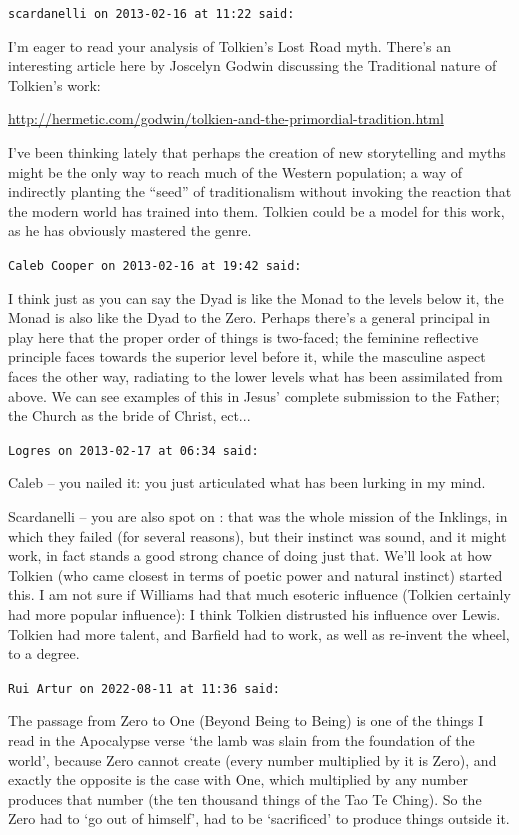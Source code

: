 \begin{footnotesize}
\begin{sffamily}
\texttt{scardanelli on 2013-02-16 at 11:22 said:}

I'm eager to read your analysis of Tolkien's Lost Road myth. There's an interesting article here by Joscelyn Godwin discussing the Traditional nature of Tolkien's work:

\url{http://hermetic.com/godwin/tolkien-and-the-primordial-tradition.html}


I've been thinking lately that perhaps the creation of new storytelling and myths might be the only way to reach much of the Western population; a way of indirectly planting the ``seed'' of traditionalism without invoking the reaction that the modern world has trained into them. Tolkien could be a model for this work, as he has obviously mastered the genre.

\hfill

\texttt{Caleb Cooper on 2013-02-16 at 19:42 said:}

I think just as you can say the Dyad is like the Monad to the levels below it, the Monad is also like the Dyad to the Zero. Perhaps there's a general principal in play here that the proper order of things is two-faced; the feminine reflective principle faces towards the superior level before it, while the masculine aspect faces the other way, radiating to the lower levels what has been assimilated from above. We can see examples of this in Jesus' complete submission to the Father; the Church as the bride of Christ, ect... 

\hfill

\texttt{Logres on 2013-02-17 at 06:34 said:}

Caleb -- you nailed it: you just articulated what has been lurking in my mind.

Scardanelli -- you are also spot on : that was the whole mission of the Inklings, in which they failed (for several reasons), but their instinct was sound, and it might work, in fact stands a good strong chance of doing just that. We'll look at how Tolkien (who came closest in terms of poetic power and natural instinct) started this. I am not sure if Williams had that much esoteric influence (Tolkien certainly had more popular influence): I think Tolkien distrusted his influence over Lewis. Tolkien had more talent, and Barfield had to work, as well as re-invent the wheel, to a degree.

\hfill

\texttt{Rui Artur on 2022-08-11 at 11:36 said:}

The passage from Zero to One (Beyond Being to Being) is one of the things I read in the Apocalypse verse `the lamb was slain from the foundation of the world', because Zero cannot create (every number multiplied by it is Zero), and exactly the opposite is the case with One, which multiplied by any number produces that number (the ten thousand things of the Tao Te Ching). So the Zero had to `go out of himself', had to be `sacrificed' to produce things outside it.


\hfill

\end{sffamily}
\end{footnotesize}

